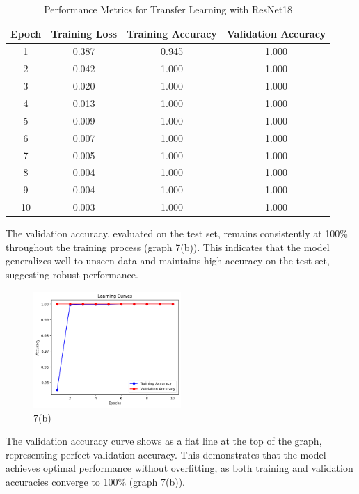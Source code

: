 \documentclass[a4paper,10 pt]{article}
\begin{document}
  \begin{table}[H]
    \centering
    \caption{Performance Metrics for Transfer Learning with ResNet18}
    \label{tab:resnet18_performance}
    \begin{tabular}{@{}cccc@{}}
      \toprule
      \textbf{Epoch} & \textbf{Training Loss} & \textbf{Training Accuracy} & \textbf{Validation Accuracy} \\
      \midrule
      1 & 0.387 & 0.945 & 1.000 \\
      2 & 0.042 & 1.000 & 1.000 \\
      3 & 0.020 & 1.000 & 1.000 \\
      4 & 0.013 & 1.000 & 1.000 \\
      5 & 0.009 & 1.000 & 1.000 \\
      6 & 0.007 & 1.000 & 1.000 \\
      7 & 0.005 & 1.000 & 1.000 \\
      8 & 0.004 & 1.000 & 1.000 \\
      9 & 0.004 & 1.000 & 1.000 \\
      10 & 0.003 & 1.000 & 1.000 \\
      \bottomrule
  \end{tabular}

  \end{table}

  The validation accuracy, evaluated on the test set, remains consistently at 100\% throughout the training process (graph 7(b)). This indicates that the model generalizes well to unseen data and maintains high accuracy on the test set, suggesting robust performance.

  \begin{figure}[H]
    \centering
    \includegraphics[width=0.5\textwidth]{graphQ7r.png} %
    \caption{7(b)}
  \end{figure}

  \vspace{12pt}

  The validation accuracy curve shows as a flat line at the top of the graph, representing perfect validation accuracy. This demonstrates that the model achieves optimal performance without overfitting, as both training and validation accuracies converge to 100\% (graph 7(b)). 
\end{document}
